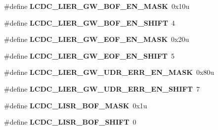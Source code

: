 \begin{DoxyCompactItemize}
\item 
\hypertarget{group___l_c_d_c___register___masks_gad865ac199a58f2a3e35b8a6255634afb}{}\#define {\bfseries L\+C\+D\+C\+\_\+\+L\+I\+E\+R\+\_\+\+G\+W\+\_\+\+B\+O\+F\+\_\+\+E\+N\+\_\+\+M\+A\+S\+K}~0x10u\label{group___l_c_d_c___register___masks_gad865ac199a58f2a3e35b8a6255634afb}

\item 
\hypertarget{group___l_c_d_c___register___masks_ga5463b4080e46391a96cd5d7dbb04ef2c}{}\#define {\bfseries L\+C\+D\+C\+\_\+\+L\+I\+E\+R\+\_\+\+G\+W\+\_\+\+B\+O\+F\+\_\+\+E\+N\+\_\+\+S\+H\+I\+F\+T}~4\label{group___l_c_d_c___register___masks_ga5463b4080e46391a96cd5d7dbb04ef2c}

\item 
\hypertarget{group___l_c_d_c___register___masks_ga21dcfbe3e06295ddb0e696bcc8edc2d0}{}\#define {\bfseries L\+C\+D\+C\+\_\+\+L\+I\+E\+R\+\_\+\+G\+W\+\_\+\+E\+O\+F\+\_\+\+E\+N\+\_\+\+M\+A\+S\+K}~0x20u\label{group___l_c_d_c___register___masks_ga21dcfbe3e06295ddb0e696bcc8edc2d0}

\item 
\hypertarget{group___l_c_d_c___register___masks_gaad660b570dc6ad415403598615ce0d5b}{}\#define {\bfseries L\+C\+D\+C\+\_\+\+L\+I\+E\+R\+\_\+\+G\+W\+\_\+\+E\+O\+F\+\_\+\+E\+N\+\_\+\+S\+H\+I\+F\+T}~5\label{group___l_c_d_c___register___masks_gaad660b570dc6ad415403598615ce0d5b}

\item 
\hypertarget{group___l_c_d_c___register___masks_ga82ced197bba69d9aadacf8ac948e59ea}{}\#define {\bfseries L\+C\+D\+C\+\_\+\+L\+I\+E\+R\+\_\+\+G\+W\+\_\+\+U\+D\+R\+\_\+\+E\+R\+R\+\_\+\+E\+N\+\_\+\+M\+A\+S\+K}~0x80u\label{group___l_c_d_c___register___masks_ga82ced197bba69d9aadacf8ac948e59ea}

\item 
\hypertarget{group___l_c_d_c___register___masks_ga5f17ec035bb90406aa46d2fd24e9e98a}{}\#define {\bfseries L\+C\+D\+C\+\_\+\+L\+I\+E\+R\+\_\+\+G\+W\+\_\+\+U\+D\+R\+\_\+\+E\+R\+R\+\_\+\+E\+N\+\_\+\+S\+H\+I\+F\+T}~7\label{group___l_c_d_c___register___masks_ga5f17ec035bb90406aa46d2fd24e9e98a}

\item 
\hypertarget{group___l_c_d_c___register___masks_ga5abce433fcc3aa6fe589e23961c2ac79}{}\#define {\bfseries L\+C\+D\+C\+\_\+\+L\+I\+S\+R\+\_\+\+B\+O\+F\+\_\+\+M\+A\+S\+K}~0x1u\label{group___l_c_d_c___register___masks_ga5abce433fcc3aa6fe589e23961c2ac79}

\item 
\hypertarget{group___l_c_d_c___register___masks_ga6ee6075743cebef4f892c11ecad27529}{}\#define {\bfseries L\+C\+D\+C\+\_\+\+L\+I\+S\+R\+\_\+\+B\+O\+F\+\_\+\+S\+H\+I\+F\+T}~0\label{group___l_c_d_c___register___masks_ga6ee6075743cebef4f892c11ecad27529}


\end{DoxyCompactItemize}
